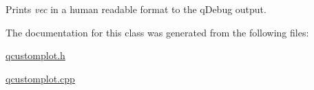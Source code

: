 Prints {\itshape vec} in a human readable format to the q\+Debug output. 

The documentation for this class was generated from the following files\+:\begin{DoxyCompactItemize}
\item 
\hyperlink{qcustomplot_8h}{qcustomplot.\+h}\item 
\hyperlink{qcustomplot_8cpp}{qcustomplot.\+cpp}\end{DoxyCompactItemize}
